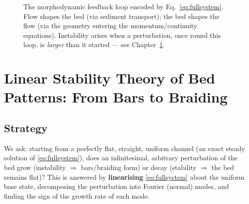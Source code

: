 \documentclass[11pt,a4paper]{report}
\theoremstyle{definition}
\theoremstyle{plain}
\theoremstyle{remark}
\newcommand{\vect}[1]{\boldsymbol{#1}}
\begin{document}
\begin{figure}[h!]
\centering
{}
\caption{The morphodynamic feedback loop encoded by Eq.~\eqref{eq:fullsystem}. Flow shapes the bed (via sediment transport); the bed shapes the flow (via the geometry entering the momentum/continuity equations). Instability arises when a perturbation, once round this loop, is \emph{larger} than it started --- see Chapter~\ref{ch:stability}.}
\label{fig:loop}
\end{figure}

\chapter{Linear Stability Theory of Bed Patterns: From Bars to Braiding}
\label{ch:stability}

\section{Strategy}
We ask: starting from a perfectly flat, straight, uniform channel (an exact steady solution of \eqref{eq:fullsystem}), does an infinitesimal, arbitrary perturbation of the bed grow (instability $\Rightarrow$ bars/braiding form) or decay (stability $\Rightarrow$ the bed remains flat)? This is answered by \textbf{linearising} \eqref{eq:fullsystem} about the uniform base state, decomposing the perturbation into Fourier (normal) modes, and finding the sign of the growth rate of each mode.
\end{document}
